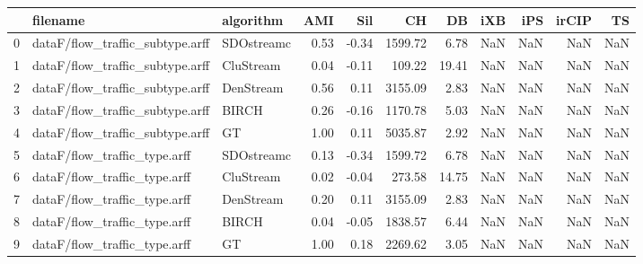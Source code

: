 \begin{tabular}{lllrrrrrrrr}
\toprule
{} &                         filename &   algorithm &  AMI &   Sil &      CH &    DB &  iXB &  iPS &  irCIP &  TS \\
\midrule
0 &  dataF/flow\_traffic\_subtype.arff &  SDOstreamc & 0.53 & -0.34 & 1599.72 &  6.78 &  NaN &  NaN &    NaN & NaN \\
1 &  dataF/flow\_traffic\_subtype.arff &   CluStream & 0.04 & -0.11 &  109.22 & 19.41 &  NaN &  NaN &    NaN & NaN \\
2 &  dataF/flow\_traffic\_subtype.arff &   DenStream & 0.56 &  0.11 & 3155.09 &  2.83 &  NaN &  NaN &    NaN & NaN \\
3 &  dataF/flow\_traffic\_subtype.arff &       BIRCH & 0.26 & -0.16 & 1170.78 &  5.03 &  NaN &  NaN &    NaN & NaN \\
4 &  dataF/flow\_traffic\_subtype.arff &          GT & 1.00 &  0.11 & 5035.87 &  2.92 &  NaN &  NaN &    NaN & NaN \\
5 &     dataF/flow\_traffic\_type.arff &  SDOstreamc & 0.13 & -0.34 & 1599.72 &  6.78 &  NaN &  NaN &    NaN & NaN \\
6 &     dataF/flow\_traffic\_type.arff &   CluStream & 0.02 & -0.04 &  273.58 & 14.75 &  NaN &  NaN &    NaN & NaN \\
7 &     dataF/flow\_traffic\_type.arff &   DenStream & 0.20 &  0.11 & 3155.09 &  2.83 &  NaN &  NaN &    NaN & NaN \\
8 &     dataF/flow\_traffic\_type.arff &       BIRCH & 0.04 & -0.05 & 1838.57 &  6.44 &  NaN &  NaN &    NaN & NaN \\
9 &     dataF/flow\_traffic\_type.arff &          GT & 1.00 &  0.18 & 2269.62 &  3.05 &  NaN &  NaN &    NaN & NaN \\
\bottomrule
\end{tabular}
